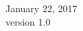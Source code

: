 \begin{titlepage}


{\large January 22, 2017}\\[0.5cm] %
{\large version 1.0}\\[2cm]
 

\vfill %
\clearpage
\end{titlepage}
